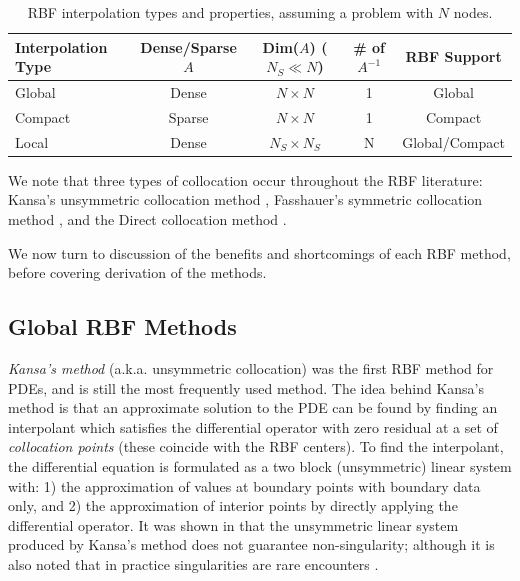 \documentclass[11pt]{report}
\begin{document}
{\begin{table}[t]
   \centering
   \begin{tabular}{E | C | C | C | c | } %
   Interpolation Type & Dense/Sparse $A$ & Dim($A$) ($N_S \ll N$) &  \# of $A^{-1}$  & RBF Support \\ 
   \hline \hline
   Global & Dense & $N \times N$ & 1 & Global \\
   Compact & Sparse & $N \times N$ & 1 & Compact \\
   Local & Dense & $N_S \times N_S$ & N & Global/Compact
   \end{tabular}
   \caption{RBF interpolation types and properties, assuming a problem with $N$ nodes.}
   \label{tbl:interp_types}
\end{table}


We note that three types of collocation occur throughout the RBF literature: 
Kansa's unsymmetric collocation method \cite{Kansa1990a, Kansa1990b}, Fasshauer's symmetric collocation method \cite
{Fasshauer1997}, and the Direct collocation method \cite{Fedoseyev2002}. 


We now turn to discussion of the benefits and shortcomings of each RBF method, before covering derivation of the methods. 

\subsection{Global RBF Methods}

\emph{Kansa's method} \cite{Kansa1990a, Kansa1990b} (a.k.a. unsymmetric collocation) was the first RBF method for PDEs, and is still the most frequently used method. The idea behind Kansa's method is that an 
approximate solution to the PDE can be found by finding an interpolant which satisfies the differential operator with zero residual at a set of \emph{collocation points} (these coincide with the RBF centers). To find the interpolant, the differential equation is formulated as a two block (unsymmetric) linear system with: 1) the approximation of values 
at boundary 
points with boundary data only, and 2) the approximation of interior points by directly applying the differential operator. It was 
shown in \cite{Fasshauer1997, Hon2001} that the unsymmetric linear system produced by Kansa's method does not guarantee 
non-singularity; although it is also noted that in practice singularities are rare encounters \cite{Larsson2003}. 

}
\end{document}
